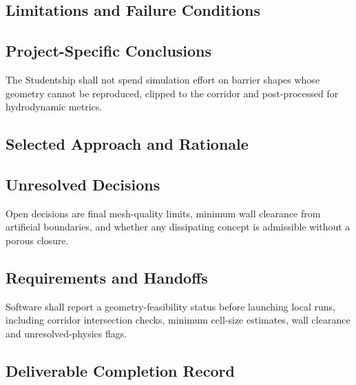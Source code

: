 
\subsection{Limitations and Failure Conditions}
\label{sec:res-geo-cst-limitations}


\subsection{Project-Specific Conclusions}
\label{sec:res-geo-cst-conclusions}

The Studentship shall not spend simulation effort on barrier shapes
whose geometry cannot be reproduced, clipped to the corridor and
post-processed for hydrodynamic metrics.

\subsection{Selected Approach and Rationale}
\label{sec:res-geo-cst-selected-approach}


\subsection{Unresolved Decisions}
\label{sec:res-geo-cst-unresolved-decisions}

Open decisions are final mesh-quality limits, minimum wall clearance
from artificial boundaries, and whether any dissipating concept is
admissible without a porous closure.

\subsection{Requirements and Handoffs}
\label{sec:res-geo-cst-requirements}

Software shall report a geometry-feasibility status before launching
local runs, including corridor intersection checks, minimum cell-size
estimates, wall clearance and unresolved-physics flags.

\subsection{Deliverable Completion Record}
\label{sec:res-geo-cst-completion-record}

%
%
%

